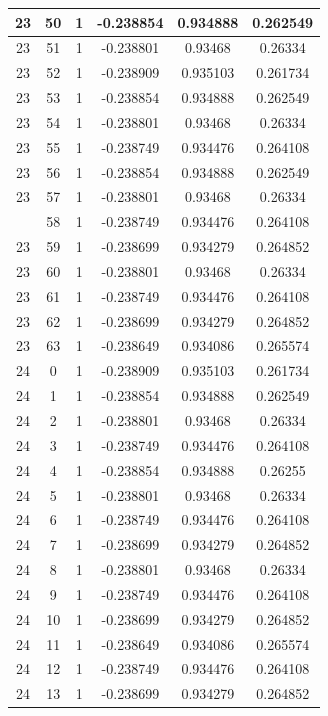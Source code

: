 \documentclass[12pt,a4paper]{article}
\numberwithin{equation}{section}
\numberwithin{figure}{section}
\numberwithin{table}{section}
\begin{document}
\begin{longtable}{|c|c|c|c|c|c|}
23 & 50 & 1 & -0.238854 & 0.934888 & 0.262549 \\ \hline
23 & 51 & 1 & -0.238801 & 0.93468 & 0.26334 \\ \hline
23 & 52 & 1 & -0.238909 & 0.935103 & 0.261734 \\ \hline
23 & 53 & 1 & -0.238854 & 0.934888 & 0.262549 \\ \hline
23 & 54 & 1 & -0.238801 & 0.93468 & 0.26334 \\ \hline
23 & 55 & 1 & -0.238749 & 0.934476 & 0.264108 \\ \hline
23 & 56 & 1 & -0.238854 & 0.934888 & 0.262549 \\ \hline
23 & 57 & 1 & -0.238801 & 0.93468 & 0.26334 \\ \hline
\pagebreak
23 & 58 & 1 & -0.238749 & 0.934476 & 0.264108 \\ \hline
23 & 59 & 1 & -0.238699 & 0.934279 & 0.264852 \\ \hline
23 & 60 & 1 & -0.238801 & 0.93468 & 0.26334 \\ \hline
23 & 61 & 1 & -0.238749 & 0.934476 & 0.264108 \\ \hline
23 & 62 & 1 & -0.238699 & 0.934279 & 0.264852 \\ \hline
23 & 63 & 1 & -0.238649 & 0.934086 & 0.265574 \\ \hline
24 & 0 & 1 & -0.238909 & 0.935103 & 0.261734 \\ \hline
24 & 1 & 1 & -0.238854 & 0.934888 & 0.262549 \\ \hline
24 & 2 & 1 & -0.238801 & 0.93468 & 0.26334 \\ \hline
24 & 3 & 1 & -0.238749 & 0.934476 & 0.264108 \\ \hline
24 & 4 & 1 & -0.238854 & 0.934888 & 0.26255 \\ \hline
24 & 5 & 1 & -0.238801 & 0.93468 & 0.26334 \\ \hline
24 & 6 & 1 & -0.238749 & 0.934476 & 0.264108 \\ \hline
24 & 7 & 1 & -0.238699 & 0.934279 & 0.264852 \\ \hline
24 & 8 & 1 & -0.238801 & 0.93468 & 0.26334 \\ \hline
24 & 9 & 1 & -0.238749 & 0.934476 & 0.264108 \\ \hline
24 & 10 & 1 & -0.238699 & 0.934279 & 0.264852 \\ \hline
24 & 11 & 1 & -0.238649 & 0.934086 & 0.265574 \\ \hline
24 & 12 & 1 & -0.238749 & 0.934476 & 0.264108 \\ \hline
24 & 13 & 1 & -0.238699 & 0.934279 & 0.264852 \\ \hline

\end{longtable}
\end{document}
